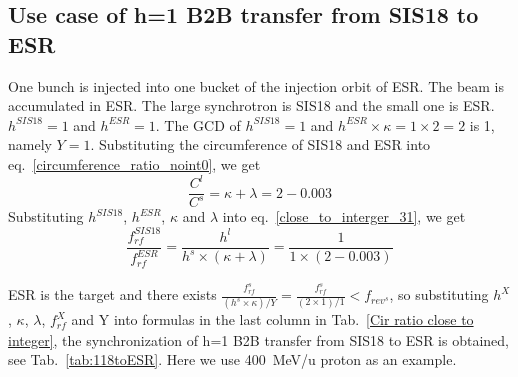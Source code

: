 \subsection{Use case of h=1 B2B transfer from SIS18 to ESR} 
One bunch is injected into one bucket of the injection orbit of ESR. The beam is accumulated in ESR. The large synchrotron is SIS18 and the small one is ESR. $h^{\mathit{SIS18}}=1$ and $h^{\mathit{ESR}}=1$. The GCD of $h^{\mathit{SIS18}}=1$ and $h^{\mathit{ESR}}\times \kappa=1\times 2=2$ is 1, namely $Y=1$. Substituting the circumference of SIS18 and ESR into eq.~\ref{circumference_ratio_noint0}, we get
\begin{equation}
\frac{C^l}{C^s}=\kappa + \lambda =2-0.003
\end{equation}
Substituting $h^{\mathit{SIS18}}$, $h^{\mathit{ESR}}$, $\kappa$ and $\lambda$ into eq.~\ref{close_to_interger_31}, we get
\begin{equation}
\frac {f_{\mathit{rf}}^{\mathit{SIS18}}}{f_{\mathit{rf}}^{\mathit{ESR}}}= \frac{h^l}{h^s \times (\kappa+ \lambda)}=\frac {1}{1 \times(2-0.003)}
\end{equation}

ESR is the target and there exists $\frac{f_{\mathit{rf}}^{s}}{(h^s \times\kappa)/Y}=\frac{f_{\mathit{rf}}^{s}}{(2 \times 1)/1}<f_{\mathit{rev}^s}$, so substituting $h^X$, $\kappa$, $\lambda$, $f_{\mathit{rf}}^{X}$ and Y into formulas in the last column in Tab.~\ref{Cir ratio close to integer}, the synchronization of h=1 B2B transfer from SIS18 to ESR is obtained, see Tab.~\ref{tab:118toESR}. Here we use \SI{400}{MeV/\atomicmassunit} proton as an example. 

